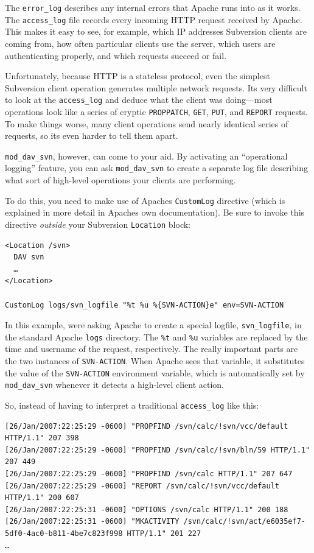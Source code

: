 The \texttt{error\_log} describes any internal errors that Apache runs
into as it works. The \texttt{access\_log} file records every incoming
HTTP request received by Apache. This makes it easy to see, for example,
which IP addresses Subversion clients are coming from, how often
particular clients use the server, which users are authenticating
properly, and which requests succeed or fail.

Unfortunately, because HTTP is a stateless protocol, even the simplest
Subversion client operation generates multiple network requests.
It\textquotesingle s very difficult to look at the \texttt{access\_log}
and deduce what the client was doing---most operations look like a
series of cryptic \texttt{PROPPATCH}, \texttt{GET}, \texttt{PUT}, and
\texttt{REPORT} requests. To make things worse, many client operations
send nearly identical series of requests, so it\textquotesingle s even
harder to tell them apart.

\texttt{mod\_dav\_svn}, however, can come to your aid. By activating an
``operational logging'' feature, you can ask \texttt{mod\_dav\_svn} to
create a separate log file describing what sort of high-level operations
your clients are performing.

To do this, you need to make use of Apache\textquotesingle s
\texttt{CustomLog} directive (which is explained in more detail in
Apache\textquotesingle s own documentation). Be sure to invoke this
directive \emph{outside} your Subversion \texttt{Location} block:

\begin{verbatim}
<Location /svn>
  DAV svn
  …
</Location>

CustomLog logs/svn_logfile "%t %u %{SVN-ACTION}e" env=SVN-ACTION
\end{verbatim}

In this example, we\textquotesingle re asking Apache to create a special
logfile, \texttt{svn\_logfile}, in the standard Apache \texttt{logs}
directory. The \texttt{\%t} and \texttt{\%u} variables are replaced by
the time and username of the request, respectively. The really important
parts are the two instances of \texttt{SVN-ACTION}. When Apache sees
that variable, it substitutes the value of the \texttt{SVN-ACTION}
environment variable, which is automatically set by
\texttt{mod\_dav\_svn} whenever it detects a high-level client action.

So, instead of having to interpret a traditional \texttt{access\_log}
like this:

\begin{verbatim}
[26/Jan/2007:22:25:29 -0600] "PROPFIND /svn/calc/!svn/vcc/default HTTP/1.1" 207 398
[26/Jan/2007:22:25:29 -0600] "PROPFIND /svn/calc/!svn/bln/59 HTTP/1.1" 207 449
[26/Jan/2007:22:25:29 -0600] "PROPFIND /svn/calc HTTP/1.1" 207 647
[26/Jan/2007:22:25:29 -0600] "REPORT /svn/calc/!svn/vcc/default HTTP/1.1" 200 607
[26/Jan/2007:22:25:31 -0600] "OPTIONS /svn/calc HTTP/1.1" 200 188
[26/Jan/2007:22:25:31 -0600] "MKACTIVITY /svn/calc/!svn/act/e6035ef7-5df0-4ac0-b811-4be7c823f998 HTTP/1.1" 201 227
…
\end{verbatim}

